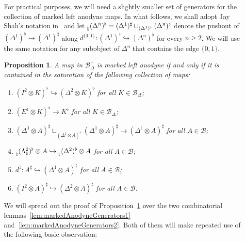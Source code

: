 \documentclass[reqno]{amsart}
\numberwithin{equation}{subsection}
\theoremstyle{plain}
\newtheorem{proposition}[equation]{Proposition}
\theoremstyle{definition}
\let\scr=\mathcal
\let\into=\hookrightarrow
\def\BB{\scr B}
\newcommand{\Simp}[1]{#1_{\Delta}}
\newcommand{\mSimp}[1]{#1_{\Delta}^+}
\begin{document}
For practical purposes, we will need a slightly smaller set of generators for the collection of marked left anodyne maps. In what follows, we shall adopt Jay Shah's notation in~\cite{Shah2018} and let $\prescript{}{\natural}(\Delta^n)^\flat=(\Delta^1)^{\sharp}\sqcup_{(\Delta^1)^\flat}(\Delta^n)^\flat$ denote the pushout of $(\Delta^1)^\flat\to (\Delta^1)^\sharp$ along $d^{\{0,1\}}\colon(\Delta^1)^\flat\into(\Delta^n)^\flat$ for every $n\geq 2$. We will use the same notation for any subobject of $\Delta^n$ that contains the edge $\{0,1\}$.
\begin{proposition}
\label{prop:markedAnodyneGenerators}
	A map in $\mSimp{\BB}$ is marked left anodyne if and only if it is contained in the saturation of the following collection of maps:
	\begin{enumerate}
	\item $(I^2\otimes K)^\flat\into(\Delta^2\otimes K)^\flat$ for all $K\in\Simp\BB$;
	\item $(E^1\otimes K)^\flat\to K^{\flat}$ for all $K\in\Simp\BB$;
	\item $(\Delta^1\otimes A)^\sharp\sqcup_{(\Delta^1\otimes A)^\flat}(\Delta^1\otimes A)^\sharp\to (\Delta^1\otimes A)^\sharp$ for all $A\in\BB$;
	\item $\prescript{}{\natural}(\Lambda^2_0)^\flat\otimes A\into \prescript{}{\natural}(\Delta^2)^\flat\otimes A$ for all $A\in\BB$;
	\item $d^1\colon A^\sharp\into(\Delta^1\otimes A)^\sharp$ for all $A\in\BB$;
	\item $(I^2\otimes A)^\sharp\into (\Delta^2\otimes A)^\sharp$ for all $A\in\BB$.
\end{enumerate}
\end{proposition}
We will spread out the proof of Proposition~\ref{prop:markedAnodyneGenerators} over the two combinatorial lemmas~\ref{lem:markedAnodyneGenerators1} and~\ref{lem:markedAnodyneGenerators2}. Both of them will make repeated use of the following basic observation:
\end{document}
